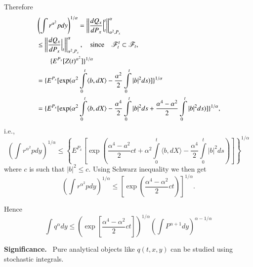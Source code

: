 Therefore
\begin{align*}
& \left(\int
  r^{\alpha^{2}}pdy\right)^{1/\alpha}=\left|\left|\frac{dQ_{x}}{dP_{x}}\Big|^{t}_{t}\right|\right|^{\alpha}_{\alpha^{2},P_{x}}\\
&\leq
  \left|\left|\frac{dQ_{x}}{dP_{x}}\Big|_{t}\right|\right|^{\alpha}_{\alpha^{2},P_{x}},\quad\text{since}\quad
  \mathscr{F}^{t}_{t}\subset \mathscr{F}_{t},\\
&\qquad \{E^{P_{x}}[Z(t)^{\alpha^{2}}]\}^{1/\alpha}\\
&= \{E^{P_{x}}[\exp (\alpha^{2}\int\limits^{t}_{0}\langle b,dX\rangle
    -\frac{\alpha^{2}}{2}\int\limits^{t}_{0}|b|^{2}ds)]\}^{1/\alpha}\\
&= \{E^{P_{x}}[\exp (\alpha^{2}\int\limits^{t}_{0}\langle b, dX\rangle
    -\frac{\alpha^{4}}{2}\int\limits^{t}_{0}|b|^{2}ds+\frac{\alpha^{4}-\alpha^{2}}{2}\int\limits^{t}_{0}|b|^{2}ds)]\}^{1/\alpha}, 
\end{align*}
i.e.,
{\fontsize{10pt}{12pt}\selectfont
$$
\left(\int r^{\alpha^{2}}pdy\right)^{1/\alpha}\leq
\left\{E^{P_{x}}\left[\exp\left(\frac{\alpha^{4}-a^{2}}{2}ct+\alpha^{2}\int\limits^{t}_{0}\langle
  b,dX\rangle
  -\frac{\alpha^{4}}{2}\int\limits^{t}_{0}|b|^{2}ds\right)\right]\right\}^{1/\alpha} 
$$}\relax
where $c$ is such that $|b|^{2}\leq c$. Using Schwarz inequality we
then get
$$
\left(\int r^{\alpha^{2}}pdy\right)^{1/\alpha}\leq
\left[\exp\left(\frac{\alpha^{4}-\alpha^{2}}{2}ct\right)\right]^{1/\alpha}. 
$$

Hence\pageoriginale
$$
\int q^{\alpha}dy\leq \left(\exp
\left[\frac{\alpha^{4}-\alpha^{2}}{2}ct\right]\right)^{1/\alpha}\left(\int P^{\alpha+1}dy\right)^{\alpha-1/\alpha}
$$ 

\noindent
{\bf Significance.}~ Pure analytical objects like $q(t,x,y)$ can be
studied using stochastic integrals.

